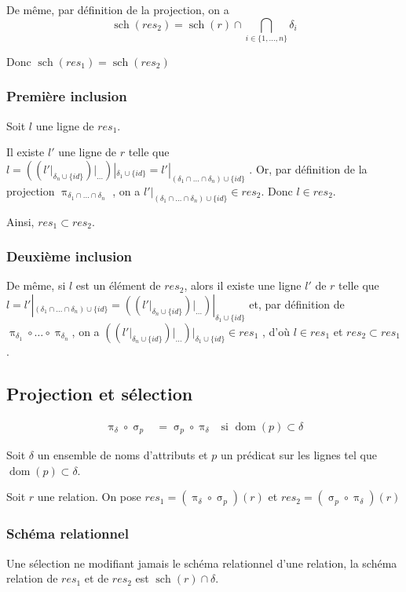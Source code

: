 \documentclass[french]{article}
\DeclareMathOperator{\proj}{\pi}
\DeclareMathOperator{\sel}{\sigma}
\DeclareMathOperator{\dom}{dom}
\DeclareMathOperator{\s}{sch}
\newcommand{\projDelta}{\proj_{\delta}}
\newcommand{\selP}{\sel_p}
\newcommand{\cip}{\cup \{id\}}
\newcommand{\intro}[2]{Soit $r$ une relation. On pose $res_1 = (#1)(r) $ et $res_2 = (#2)(r) $}
\begin{document}
De même, par définition de la projection, on a
$$
\s(res_2) = 
\s(r) \cap \bigcap_{i \in \{ 1, \dots, n \} } \delta_i
$$

Donc $\s(res_1) = \s(res_2)$

\subsubsection*{Première inclusion}
Soit $l$ une ligne de $res_1$.

Il existe $l'$ une ligne de $r$ telle que
$
l = {\left( 
	 {\left(    
	  l'|_{\delta_n \cip} 
	 \right)} |_{\dots }
	\right)} |_{\delta_1 \cip}
= l'|_{(\delta_1 \cap \dots \cap \delta_n) \cip}
$
.
Or, par définition de la projection $\proj_{\delta_1 \cap \dots \cap \delta_n}$ ,
on a $l' |_{(\delta_1 \cap \dots \cap \delta_n) \cip} \in res_2$.
Donc $l \in res_2$.

Ainsi, $res_1 \subset res_2$.

\subsubsection*{Deuxième inclusion}
De même, si $l$ est un élément de $res_2$,
alors il existe une ligne $l'$ de $r$ telle que
$l = l' |_{(\delta_1 \cap \dots \cap \delta_n) \cip} = 
 {\left( 
	{\left(    
		l'|_{\delta_n \cip} 
		\right)} |_{\dots }
	\right)} |_{\delta_1 \cip}
$
et, par définition de 
$\proj_{\delta_1}\circ \dots \circ \proj_{\delta_n}$, on a
$
{\left( 
	{\left(    
		l'|_{\delta_n \cip} 
		\right)} |_{\dots }
	\right)} |_{\delta_1 \cip}
\in res_1
$ 
, d'où $l \in res_1$ et $res_2 \subset res_1$.

\subsection*{Projection et sélection}
\begin{align}
\projDelta \circ \selP
& = \selP \circ \projDelta
& \text{si $\dom(p) \subset \delta$}
\end{align}

Soit $\delta$ un ensemble de noms d'attributs
et $p$ un prédicat sur les lignes tel que
$\dom(p) \subset \delta$.

\intro{\projDelta \circ \selP}{\selP \circ \projDelta}

\subsubsection*{Schéma relationnel}
Une sélection ne modifiant jamais le schéma relationnel
d'une relation,
la schéma relation de $res_1$ et de $res_2$ est
$\s(r) \cap \delta$.
\end{document}

